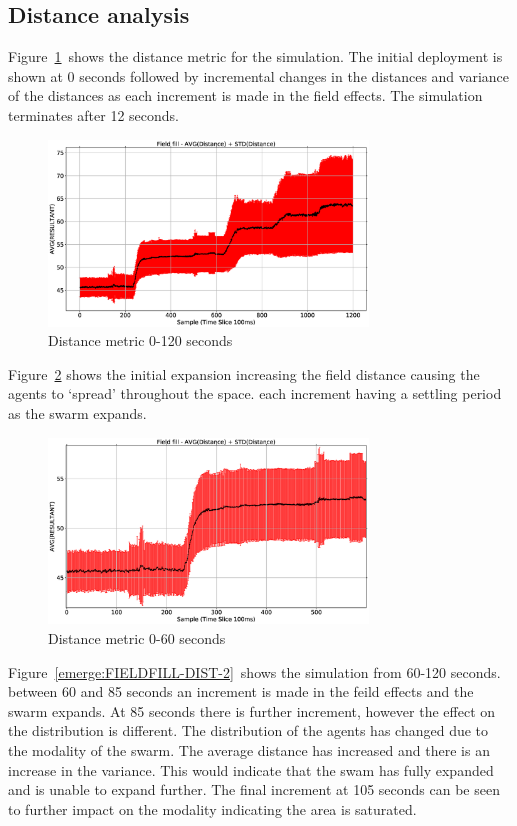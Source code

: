 \documentclass[10pt,journal,letterpaper,twoside]{IEEEtran}
\begin{document}
\subsection{Distance analysis}
Figure~\ref{emerge:FIELDFILL-DIST}~shows the distance metric for the simulation. The initial deployment is shown at 0 seconds followed by incremental changes in the distances and variance of the distances as each increment is made in the field effects. The simulation terminates after 12 seconds.

\begin{figure}
\begin{center}
\includegraphics[width=8.5cm]{figures/FIELDFILL-DIST}
\end{center}
\caption{Distance metric 0-120 seconds\label{emerge:FIELDFILL-DIST}}
\end{figure}

Figure~\ref{emerge:FIELDFILL-DIST-1} shows the initial expansion increasing the field distance causing the agents to `spread' throughout the space. each increment having a settling period as the swarm expands.

\begin{figure}
\begin{center}
\includegraphics[width=8.5cm]{figures/FIELDFILL-DIST-1}
\end{center}
\caption{Distance metric 0-60 seconds\label{emerge:FIELDFILL-DIST-1}}
\end{figure}

Figure~\ref{emerge:FIELDFILL-DIST-2}~shows the simulation from 60-120 seconds. between 60 and 85 seconds an increment is made in the feild effects and the swarm expands. At 85 seconds there is further increment, however the effect on the distribution is different. The distribution of the agents has changed due to the modality of the swarm. The average distance has increased and there is an increase in the variance. This would indicate that the swam has fully expanded and is unable to expand further. The final increment at 105 seconds can be seen to further impact on the modality indicating the area is saturated.
\end{document}

